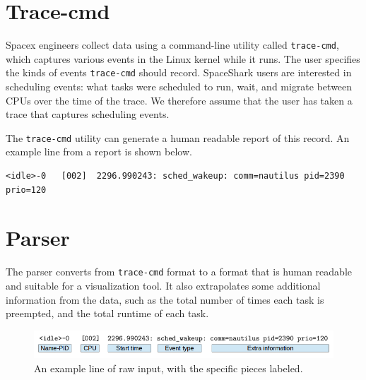 \documentclass{hmcclinic}
\begin{document}
  \section{Trace-cmd}

  Spacex engineers collect data using a command-line utility called \texttt{trace-cmd},
 which captures various events in the Linux kernel while it runs. The user specifies the kinds of events \texttt{trace-cmd} should record. SpaceShark users are interested in scheduling events: what tasks were
  scheduled to run, wait, and migrate between CPUs over the time of the trace.
  We therefore assume that the user has taken a trace that captures scheduling
  events.

  The \texttt{trace-cmd} utility can generate a human readable
  report of this record. An example line from a report is shown below.
  
\footnotesize\begin{verbatim}<idle>-0   [002]  2296.990243: sched_wakeup: comm=nautilus pid=2390 prio=120\end{verbatim}

\normalsize
  

  \section{Parser}
  The parser converts from \texttt{trace-cmd} format to a format that is human readable and suitable for a visualization tool. It also extrapolates some additional information from the data, such as the total number of times each task is preempted, and the total runtime of each task.

  \begin{figure}
  \includegraphics[scale=0.4]{parserExample.png}
  \caption{An example line of raw input, with the specific pieces labeled.}
  \end{figure}
\end{document}
